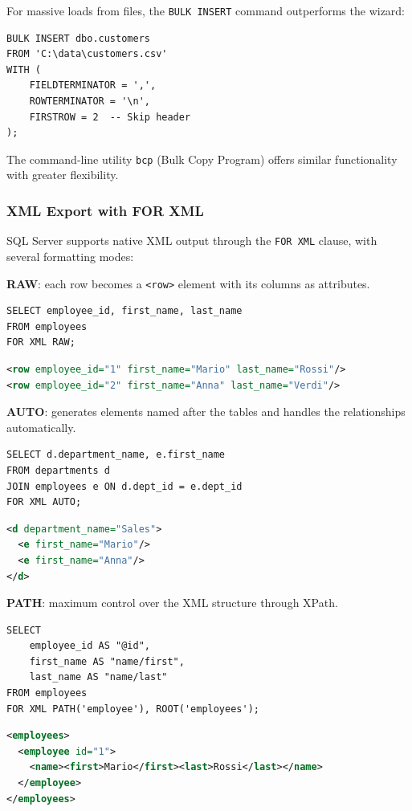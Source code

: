 For massive loads from files, the \texttt{BULK INSERT} command outperforms the wizard:

\begin{lstlisting}
BULK INSERT dbo.customers
FROM 'C:\data\customers.csv'
WITH (
    FIELDTERMINATOR = ',',
    ROWTERMINATOR = '\n',
    FIRSTROW = 2  -- Skip header
);
\end{lstlisting}

The command-line utility \texttt{bcp} (Bulk Copy Program) offers similar functionality with greater flexibility.

\subsubsection{XML Export with FOR XML}
\label{subsec:for-xml}

SQL Server supports native XML output through the \texttt{FOR XML} clause, with several formatting modes:

\textbf{RAW}: each row becomes a \texttt{<row>} element with its columns as attributes.
\begin{lstlisting}
SELECT employee_id, first_name, last_name
FROM employees
FOR XML RAW;
\end{lstlisting}
\begin{lstlisting}[language=XML]
<row employee_id="1" first_name="Mario" last_name="Rossi"/>
<row employee_id="2" first_name="Anna" last_name="Verdi"/>
\end{lstlisting}

\textbf{AUTO}: generates elements named after the tables and handles the relationships automatically.
\begin{lstlisting}
SELECT d.department_name, e.first_name
FROM departments d
JOIN employees e ON d.dept_id = e.dept_id
FOR XML AUTO;
\end{lstlisting}
\begin{lstlisting}[language=XML]
<d department_name="Sales">
  <e first_name="Mario"/>
  <e first_name="Anna"/>
</d>
\end{lstlisting}

\textbf{PATH}: maximum control over the XML structure through XPath.
\begin{lstlisting}
SELECT
    employee_id AS "@id",
    first_name AS "name/first",
    last_name AS "name/last"
FROM employees
FOR XML PATH('employee'), ROOT('employees');
\end{lstlisting}
\begin{lstlisting}[language=XML]
<employees>
  <employee id="1">
    <name><first>Mario</first><last>Rossi</last></name>
  </employee>
</employees>
\end{lstlisting}


